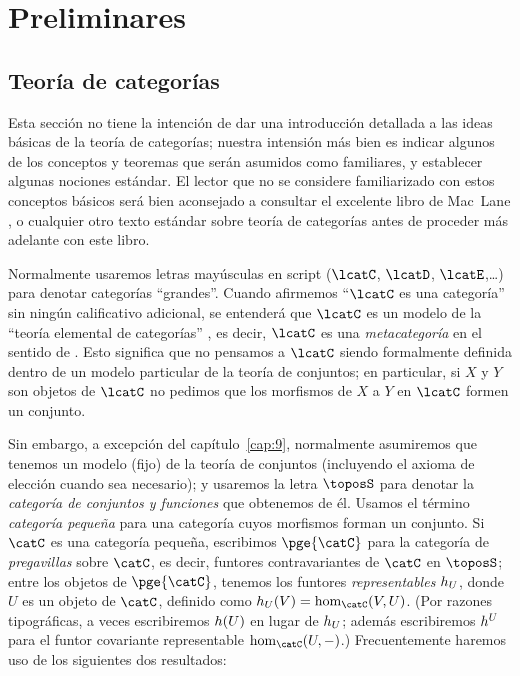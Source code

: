 \chapter{Preliminares}
\label{cap:0}

\section{Teoría de categorías}
\label{sec:0.1}

Esta sección no tiene la intención de dar una introducción detallada a las ideas
básicas de la teoría de categorías; nuestra intensión más bien es indicar
algunos de los conceptos y teoremas que serán asumidos como familiares, y
establecer algunas nociones estándar. El lector que no se considere familiarizado
con estos conceptos básicos será bien aconsejado a consultar el excelente libro
de Mac~Lane \pend{[CW]}, o cualquier otro texto estándar sobre teoría de
categorías antes de proceder más adelante con este libro.

Normalmente usaremos letras mayúsculas en script 
(\(\lcatC\), \(\lcatD\), \(\lcatE\),\dots) para denotar categorías
\enquote{grandes}. Cuando afirmemos \enquote{\(\lcatC\) es una categoría} sin
ningún calificativo adicional, se entenderá que \(\lcatC\) es un modelo de la
\enquote{teoría elemental de categorías} \pend{[72]}, es decir, \(\lcatC\) es
una \emph{metacategoría} en el sentido de . Esto
significa que no pensamos a \(\lcatC\) siendo formalmente definida dentro de un
modelo particular de la teoría de conjuntos; en particular, si \(X\) y \(Y\) son
objetos de \(\lcatC\) no pedimos que los morfismos de \(X\) a \(Y\) en
\(\lcatC\) formen un conjunto.

Sin embargo, a excepción del capítulo~\ref{cap:9}, normalmente asumiremos que
tenemos un modelo (fijo) de la teoría de conjuntos (incluyendo el axioma de
elección cuando sea necesario); y usaremos la letra \(\con\) para denotar la
\emph{categoría de conjuntos y funciones} que obtenemos de él. Usamos el término
\emph{categoría pequeña} para una categoría cuyos morfismos forman un conjunto.
Si \(\catC\) es una categoría pequeña, escribimos \(\pge{\catC}\) para la
categoría de \emph{pregavillas} sobre \(\catC\), es decir, funtores
contravariantes de \(\catC\) en \(\con\); entre los objetos de \(\pge{\catC}\),
tenemos los funtores \emph{representables} \(h_U\), donde \(U\) es un objeto
de \(\catC\), definido como \(\gy_U(V)=\hom_{\catC}(V,U)\). (Por razones
tipográficas, a veces escribiremos \(h(U)\) en lugar de \(h_U\); además
escribiremos \(h^U\) para el funtor covariante representable
\(\hom_{\catC}(U,-)\).) Frecuentemente haremos uso de los siguientes dos
resultados:

